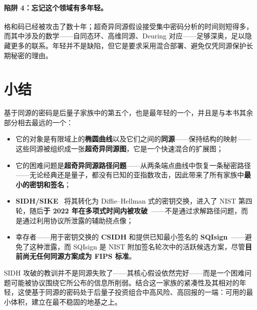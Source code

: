 \paragraph{陷阱 4：忘记这个领域有多年轻。}
格和码已经被攻击了数十年；超奇异同源假设接受集中密码分析的时间则短得多，而其中涉及的数学——自同态环、高维同源、Deuring 对应——足够深奥，足以隐藏更多的联系。年轻并不是缺陷，但它是要求采用混合部署、避免仅凭同源保护长期秘密的理由。

\section{小结}

基于同源的密码是后量子家族中的第五个，也是最年轻的一个，并且是与本书其余部分相去最远的一个：

\begin{itemize}
  \item 它的对象是有限域上的\textbf{椭圆曲线}以及它们之间的\textbf{同源}——保持结构的映射——这些同源被组织成一张\textbf{超奇异同源图}，它是一个快速混合的扩展图；
  \item 它的困难问题是\textbf{超奇异同源路径问题}——从两条端点曲线中恢复一条秘密路径——无论经典还是量子，都没有已知的亚指数攻击，因此带来了所有家族中\textbf{最小的密钥和签名}；
  \item \textbf{SIDH/SIKE}~\cite{jaodefeo2011} 将其转化为 Diffie--Hellman 式的密钥交换，进入了 NIST 第四轮，随后\textbf{于 2022 年在多项式时间内被攻破}~\cite{castryckdecru2023}——不是通过求解路径问题，而是通过利用协议所泄露的辅助挠点像；
  \item 幸存者——用于密钥交换的 \textbf{CSIDH} 和提供已知最小签名的 \textbf{SQIsign}~\cite{sqisign2020}——避免了这种泄露，而 SQIsign 是 NIST 附加签名轮次中的活跃候选方案，尽管\textbf{目前尚无任何同源方案成为 FIPS 标准}。
\end{itemize}

SIDH 攻破的教训并不是同源失败了——其核心假设依然完好——而是一个困难问题可能被协议围绕它所公布的信息所削弱。结合这一家族的紧凑性及其相对的年轻，这使基于同源的密码处于后量子投资组合中高风险、高回报的一端：可用的最小体积，建立在最不稳固的地基之上。

\printbibliography[heading=chapterrefs]
